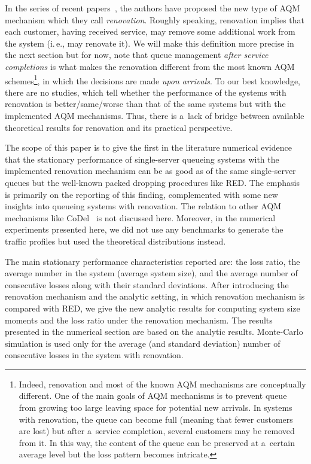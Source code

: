 \begin{multicols}{2}
In the series of recent papers~\cite{Kreinin,Zaryadov2010,zarN1,zarN2,Zaryadov2009},
the authors have proposed the new type of AQM mechanism which they call 
\textit{renovation}. 
Roughly speaking, renovation implies that each customer, 
having received service, may remove some additional work from the system
(i.\,e., may renovate it). We will make this definition more precise in the next 
section 
but for now, note 
that queue management \textit{after service completions} is what makes the renovation
 different 
from the most known AQM schemes\footnote[3]{Indeed, renovation and most of the known AQM 
mechanisms
are conceptually different. One of the main goals of AQM mechanisms is to prevent 
queue from growing too large
leaving space for potential new arrivals.
In systems with renovation, the queue can become full (meaning that fewer customers are 
lost)
but after a~service completion, several customers may be removed from it. In this way, 
the content of the queue
can be preserved at a~certain average level but the loss pattern becomes intricate.}, 
in which the decisions are made \textit{upon arrivals}.  
To our best knowledge, there are no studies, 
which tell whether the performance of the systems with renovation is
better/same/worse than that of the same systems but with the implemented AQM mechanisms.
Thus, there is a~lack of bridge between available theoretical results for renovation and 
its practical perspective.

The scope of this paper is to give the first in the literature numerical evidence 
that the stationary performance of 
single-server queueing systems with the implemented renovation mechanism can
be as good as of 
the same single-server queues but the well-known packed dropping procedures like RED.
The emphasis is primarily on the reporting of this finding, complemented 
with some new insights into 
queueing systems with renovation. The relation to other 
AQM mechanisms like CoDel~\cite{RFC8289} is not discussed here. 
Moreover, in the numerical experiments presented here, 
we did not use any benchmarks to generate the traffic profiles 
but used the theoretical distributions instead.

The main stationary performance characteristics reported are: the loss ratio, 
the average number in the system
(average system size), and the average number of consecutive losses along with 
their standard deviations.
After introducing the renovation mechanism and the analytic setting,
in which  renovation mechanism is compared with RED, we give the new analytic results 
for computing system size moments and the loss ratio under the renovation mechanism.
The results presented in the numerical section are based on the analytic results. 
Monte-Carlo simulation is used only for the average (and standard deviation) 
number of consecutive losses in the system with renovation. 



\end{multicols}
